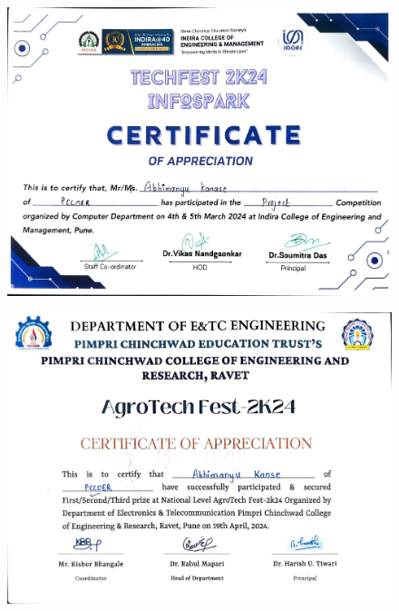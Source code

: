\documentclass[12pt,a4paper]{report}
\begin{document}
\begin{figure}[!htb]
\begin{center}
\includegraphics[scale=0.2]{images/certificates/certificates/Abhi1.jpg}
\end{center}
\end{figure}
\begin{figure}[!htb]
\begin{center}
\includegraphics[scale=0.2]{images/certificates/certificates/Abhi2.jpg}
\end{center}
\end{figure}
\end{document}
